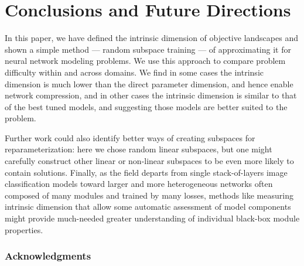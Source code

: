 \documentclass{article} %
\begin{document}
\vspace*{-.1cm}

\section{Conclusions and Future Directions}
\vspace*{-.2cm}

In this paper, we have defined the intrinsic dimension of objective landscapes and shown  
a simple method --- random subspace training --- of approximating it for neural network modeling problems.
We use this approach to compare problem difficulty within and across domains.
We find in some cases the intrinsic dimension is much lower than the direct parameter dimension, and hence enable network compression, 
and in other cases the intrinsic dimension is similar to that of the best tuned models, and suggesting those models are better suited to the problem.



Further work could also identify better ways of creating subspaces for
reparameterization: here we chose random linear subspaces, but one
might carefully construct other linear or non-linear subspaces to be
even more likely to contain solutions.
Finally, as the field departs from
single stack-of-layers image classification models toward
larger and more heterogeneous networks \citep{ren-2015-faster-r-cnn:-towards,kaiser-2017-arXiv-one-model-to-learn-them}
often composed of many modules and trained by many losses,
methods like measuring intrinsic dimension that allow some automatic assessment of model components might provide much-needed greater understanding
of individual black-box module properties.



\subsubsection*{Acknowledgments}
\end{document}
